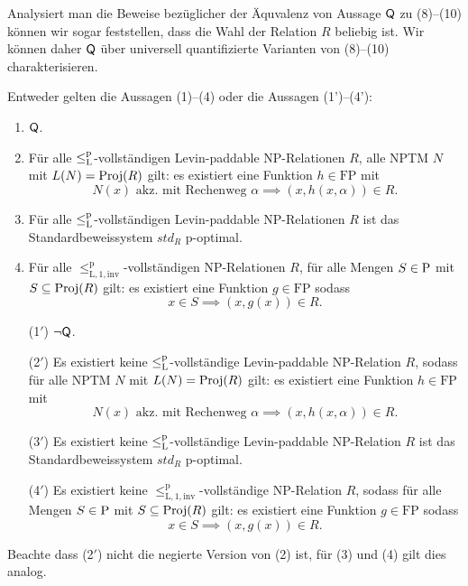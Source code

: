 Analysiert man die Beweise bezüglicher der Äquvalenz von Aussage $\hQ$ zu (8)--(10) können wir sogar feststellen, dass die Wahl der Relation $R$ beliebig ist. 
Wir können daher $\hQ$ über universell quantifizierte Varianten von (8)--(10) charakterisieren. 
\begin{theorem}
    Entweder gelten die Aussagen (1)--(4) oder die Aussagen (1')--(4'):
    \begin{enumerate}
        \item $\hQ$.
        \item Für alle $\leqlp$-vollständigen Levin-paddable NP-Relationen $R$, alle NPTM $N$ mit $L(N)=\Proj(R)$ gilt: es existiert eine Funktion $h\in\mathrm{FP}$ mit
            \[ N(x) \text{ akz. mit Rechenweg $\alpha$} \implies (x,h(x,\alpha))\in R. \]
        \item Für alle $\leqlp$-vollständigen Levin-paddable NP-Relationen $R$ ist das Standardbeweissystem $\mathit{std}_R$ p-optimal.
        \item Für alle $\leq_\mathrm{L,1,inv}^\mathrm p$-vollständigen NP-Relationen $R$, für alle Mengen $S\in \P$ mit $S\subseteq \Proj(R)$ gilt: es existiert eine Funktion $g\in\mathrm{FP}$ sodass
            \[ x\in S \implies (x, g(x))\in R. \]
        \item[(1$'$)] $\neg\hQ$.
        \item[(2$'$)] Es existiert keine $\leqlp$-vollständige Levin-paddable NP-Relation $R$, sodass für alle NPTM $N$ mit $L(N)=\Proj(R)$ gilt: es existiert eine Funktion $h\in\mathrm{FP}$ mit
            \[ N(x) \text{ akz. mit Rechenweg $\alpha$} \implies (x,h(x,\alpha))\in R. \]
        \item[(3$'$)] Es existiert keine $\leqlp$-vollständige Levin-paddable NP-Relation $R$ ist das Standardbeweissystem $\mathit{std}_R$ p-optimal.
        \item[(4$'$)] Es existiert keine $\leq_\mathrm{L,1,inv}^\mathrm p$-vollständige NP-Relation $R$, sodass für alle Mengen $S\in \P$ mit $S\subseteq \Proj(R)$ gilt: es existiert eine Funktion $g\in\mathrm{FP}$ sodass
            \[ x\in S \implies (x, g(x))\in R. \]
    \end{enumerate}
    Beachte dass (2$'$) nicht die negierte Version von (2) ist, für (3) und (4) gilt dies analog.
\end{theorem}

